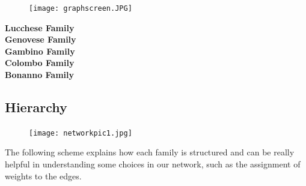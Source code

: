 \documentclass{article}
\begin{document}
\begin{figure}[hbt!]
\centering
\texttt{[image: graphscreen.JPG]}
\advance\leftskip-3cm
\end{figure}



\vspace{-50pt}
\begin{flushright}
\advance\rightskip-2cm
\color{Lucchese}
\textbf{Lucchese Family}\\
\color{Genovese}
\textbf{Genovese Family}\\
\color{Gambino}
\textbf{Gambino Family}\\
\color{Colombo}
\textbf{Colombo Family}\\
\color{Bonanno}
\textbf{Bonanno Family}
\end{flushright}
\newpage



\subsection*{\hypertarget{Hierarchy}{\textcolor{Titoli}{Hierarchy}}}



\begin{figure}[t!]
\vspace{-250pt}
\centering
\texttt{[image: networkpic1.jpg]}
\advance\leftskip-3.52cm
\end{figure}



The following scheme explains how each family is structured and can be really helpful in understanding some choices in our network, such as the assignment of weights to the edges.
\end{document}

